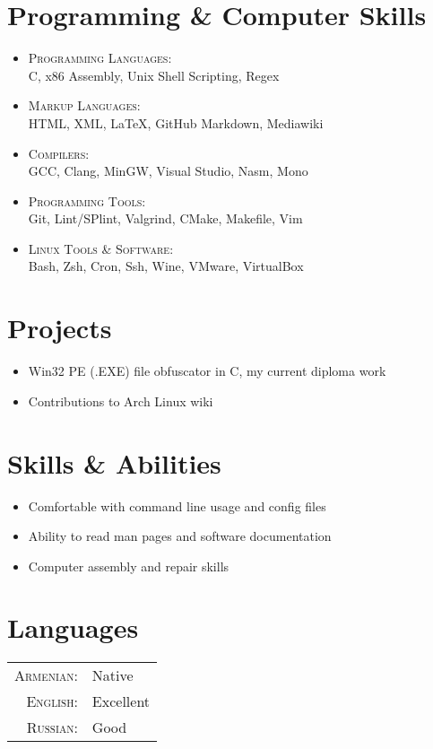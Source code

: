 \documentclass[a4paper,10pt]{article}
\begin{document}
\section{Programming \& Computer Skills}
\begin{itemize}
\item \textsc{Programming Languages}:\\
	C, x86 Assembly, Unix Shell Scripting, Regex
\item \textsc{Markup Languages}:\\
	HTML, XML, \LaTeX, GitHub Markdown, Mediawiki
\item \textsc{Compilers}:\\
	GCC, Clang, MinGW, Visual Studio, Nasm, Mono
\item \textsc{Programming Tools}:\\
	Git, Lint/SPlint, Valgrind, CMake, Makefile, Vim
\item \textsc{Linux Tools \& Software}:\\
	Bash, Zsh, Cron, Ssh, Wine, VMware, VirtualBox
\end{itemize}

\section{Projects}
\begin{itemize}
\item Win32 PE (.EXE) file obfuscator in C, my current diploma work\\
{}
\item Contributions to Arch Linux wiki\\
{}
\end{itemize}

\section{Skills \& Abilities}
\begin{itemize}
\item Comfortable with command line usage and config files
\item Ability to read man pages and software documentation
\item Computer assembly and repair skills
\end{itemize}

\section{Languages}
\begin{tabular}{r l}
\textsc{Armenian}: & Native\\
\textsc{English}: & Excellent\\
\textsc{Russian}: & Good
\end{tabular}
\end{document}
